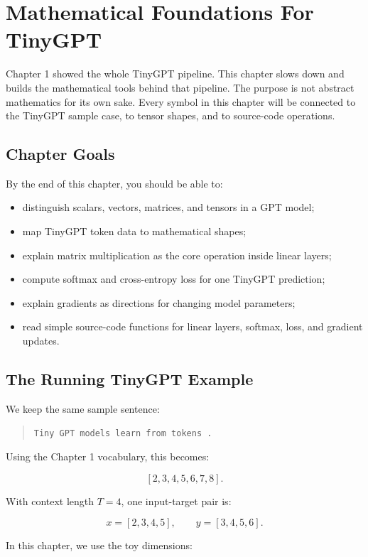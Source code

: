 \chapter{Mathematical Foundations For TinyGPT}

Chapter 1 showed the whole TinyGPT pipeline. This chapter slows down and builds the mathematical tools behind that pipeline. The purpose is not abstract mathematics for its own sake. Every symbol in this chapter will be connected to the TinyGPT sample case, to tensor shapes, and to source-code operations.

\section{Chapter Goals}

By the end of this chapter, you should be able to:

\begin{itemize}
  \item distinguish scalars, vectors, matrices, and tensors in a GPT model;
  \item map TinyGPT token data to mathematical shapes;
  \item explain matrix multiplication as the core operation inside linear layers;
  \item compute softmax and cross-entropy loss for one TinyGPT prediction;
  \item explain gradients as directions for changing model parameters;
  \item read simple source-code functions for linear layers, softmax, loss, and gradient updates.
\end{itemize}

\section{The Running TinyGPT Example}

We keep the same sample sentence:

\begin{quote}
\texttt{Tiny GPT models learn from tokens .}
\end{quote}

Using the Chapter 1 vocabulary, this becomes:

\[
[2,3,4,5,6,7,8].
\]

With context length \(T=4\), one input-target pair is:

\[
x=[2,3,4,5],
\qquad
y=[3,4,5,6].
\]

In this chapter, we use the toy dimensions:


